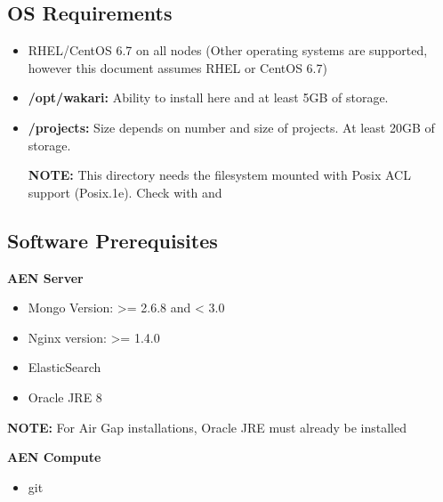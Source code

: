 \documentclass[letterpaper,10pt,openany,oneside]{sphinxmanual}
\begin{document}
\subsection{OS Requirements}
\label{AnacondaEnterpriseNotebooks:os-requirements}\begin{itemize}
\item {} 
RHEL/CentOS 6.7 on all nodes (Other operating systems are supported,
however this document assumes RHEL or CentOS 6.7)

\item {} 
\textbf{/opt/wakari:} Ability to install here and at least 5GB of storage.

\item {} 
\textbf{/projects:} Size depends on number and size of projects. At least
20GB of storage.

\textbf{NOTE:} This directory needs the filesystem mounted with Posix ACL
support (Posix.1e). Check with  and

\end{itemize}


\subsection{Software Prerequisites}
\label{AnacondaEnterpriseNotebooks:software-prerequisites}
\textbf{AEN Server}
\begin{itemize}
\item {} 
Mongo Version: \textgreater{}= 2.6.8 and \textless{} 3.0

\item {} 
Nginx version: \textgreater{}= 1.4.0

\item {} 
ElasticSearch

\item {} 
Oracle JRE 8

\end{itemize}

\textbf{NOTE:} For Air Gap installations, Oracle JRE must already be
installed

\textbf{AEN Compute}
\begin{itemize}
\item {} 
git

\end{itemize}
\end{document}
